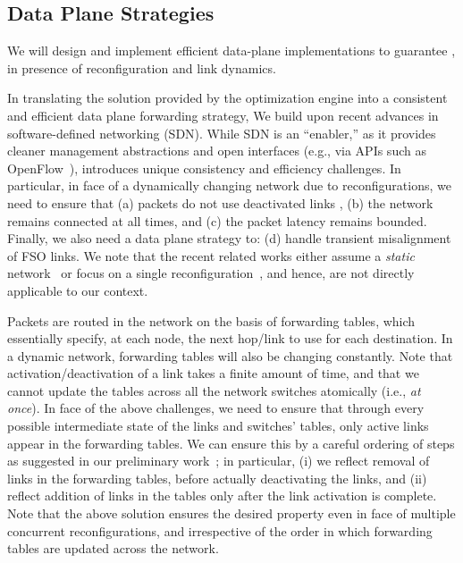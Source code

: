 \subsection{Data Plane Strategies}

\begin{task}
\label{task:system:dataplane}
We will design and implement efficient data-plane implementations to
guarantee , in presence
of reconfiguration and link dynamics.
\end{task}

In translating the solution provided by the optimization engine into a
consistent and efficient data plane forwarding strategy, We build upon
recent advances in software-defined networking (SDN).  While SDN is an
``enabler,'' as it provides cleaner management abstractions and open
interfaces (e.g., via APIs such as OpenFlow~\cite{}), \ArchName
introduces unique consistency and efficiency challenges.  In
particular, in face of a dynamically changing network due to
reconfigurations, we need to ensure that (a) packets do not use
deactivated links , (b)
the network remains connected at all times, and (c) the packet latency
remains bounded. Finally, we also need a data plane strategy to: (d)
handle transient misalignment of FSO links. We note that the recent
related works either assume a {\em static}
network~\cite{cons-update,incconsupdate} or focus on a single
reconfiguration~\cite{cu-1}, and hence, are not directly applicable to
our context.

Packets are routed in the network on the basis of forwarding tables,
which essentially specify, at each node, the next hop/link to use for
each destination. In a dynamic network, forwarding tables will also be
changing constantly.  Note that activation/deactivation of a link
takes a finite amount of time, and that we cannot update the tables
across all the network switches atomically (i.e., {\em at once}).
%
In face of the above challenges, we need to ensure that through every
possible intermediate state of the links and switches' tables, only
active links appear in the forwarding tables. We can ensure this by a
careful ordering of steps as suggested in our preliminary
work~\cite{hotnets}; in particular, (i) we reflect removal of links in
the forwarding tables, before actually deactivating the links, and
(ii) reflect addition of links in the tables only after the link
activation is complete. Note that the above solution ensures the
desired property even in face of multiple concurrent reconfigurations,
and irrespective of the order in which forwarding tables are updated
across the network.

